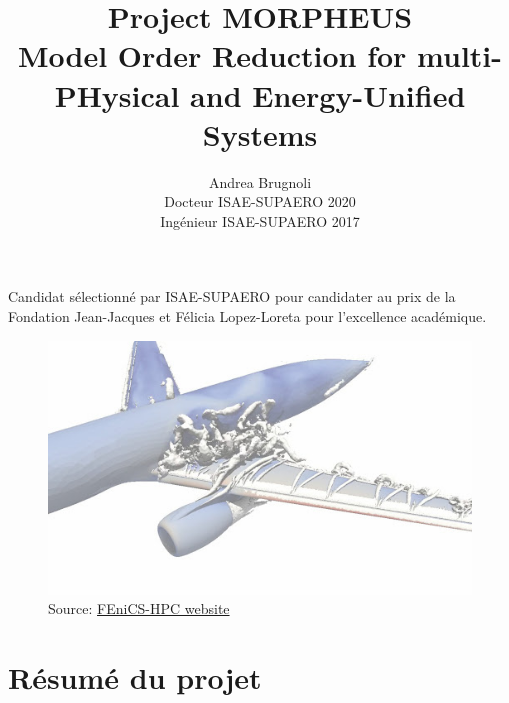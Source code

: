 \documentclass[12pt, french]{article}
\author{Andrea Brugnoli \\ 
	\hspace{2.8pt} Docteur ISAE-SUPAERO 2020\\
	Ingénieur ISAE-SUPAERO 2017}
\title{Project MORPHEUS \\
	\vspace{.3cm}
	\Large{Model Order Reduction for multi-PHysical and Energy-Unified Systems}  }
\date{}
\begin{document}
	
	\maketitle
	
	\large{\noindent Candidat sélectionné par ISAE-SUPAERO pour candidater au prix de la Fondation Jean-Jacques et Félicia Lopez-Loreta pour l'excellence académique. }

	
	
	\begin{figure}[h]
		\centering
		\includegraphics[width=.95\textwidth]{3Dplane.jpg}
		\captionsetup{labelformat=empty}
		\caption{Source: \href{http://www.fenics-hpc.org/}{FEniCS-HPC website}}
	\end{figure}
	
	
	
	
	
	\thispagestyle{empty}
	
	\newpage
	
	\tableofcontents
	\newpage
	
	
	\section{Résumé du projet}
	
\end{document}
